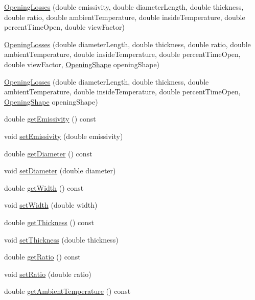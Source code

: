 \begin{DoxyCompactItemize}
\item 
\hyperlink{class_opening_losses_a4a9e344af1207bcc48f63a3fc2201aeb}{Opening\+Losses} (double emissivity, double diameter\+Length, double thickness, double ratio, double ambient\+Temperature, double inside\+Temperature, double percent\+Time\+Open, double view\+Factor)
\item 
\hyperlink{class_opening_losses_a274bf4f0e302d03a270e7c61c1c43055}{Opening\+Losses} (double diameter\+Length, double thickness, double ratio, double ambient\+Temperature, double inside\+Temperature, double percent\+Time\+Open, double view\+Factor, \hyperlink{class_opening_losses_a57f9759b6fd72a1b75aa885800e26157}{Opening\+Shape} opening\+Shape)
\item 
\hyperlink{class_opening_losses_a93adcb54a21a2bcb796e0e4946360a3a}{Opening\+Losses} (double diameter\+Length, double thickness, double ambient\+Temperature, double inside\+Temperature, double percent\+Time\+Open, \hyperlink{class_opening_losses_a57f9759b6fd72a1b75aa885800e26157}{Opening\+Shape} opening\+Shape)
\item 
double \hyperlink{class_opening_losses_a7eaf8e68f268e8ff1671c5f9f0462b4f}{get\+Emissivity} () const
\item 
void \hyperlink{class_opening_losses_aa63eb1c2ba9057d401f3a7f5dd974afe}{set\+Emissivity} (double emissivity)
\item 
double \hyperlink{class_opening_losses_a8ed643300b0f5b606be6cd669cd413c3}{get\+Diameter} () const
\item 
void \hyperlink{class_opening_losses_ab840ba51788e83c0b1dc9b8c05b1eadb}{set\+Diameter} (double diameter)
\item 
double \hyperlink{class_opening_losses_a0374aeac5532188358b5f6ad0f120305}{get\+Width} () const
\item 
void \hyperlink{class_opening_losses_a5ee8c514917c16ecd2c63caecc98e1c6}{set\+Width} (double width)
\item 
double \hyperlink{class_opening_losses_aeefdf4431056de65ca84c6dfb24b61e1}{get\+Thickness} () const
\item 
void \hyperlink{class_opening_losses_a221cc88072e4f0975f15c6cd96781dea}{set\+Thickness} (double thickness)
\item 
double \hyperlink{class_opening_losses_ac9f7dbd2cc023932b5d8076a21a3f690}{get\+Ratio} () const
\item 
void \hyperlink{class_opening_losses_aab7f82f24511c37f0bc4b29cbc7239b5}{set\+Ratio} (double ratio)
\item 
double \hyperlink{class_opening_losses_a198f46508744d6943846ea95a9513a45}{get\+Ambient\+Temperature} () const

\end{DoxyCompactItemize}
